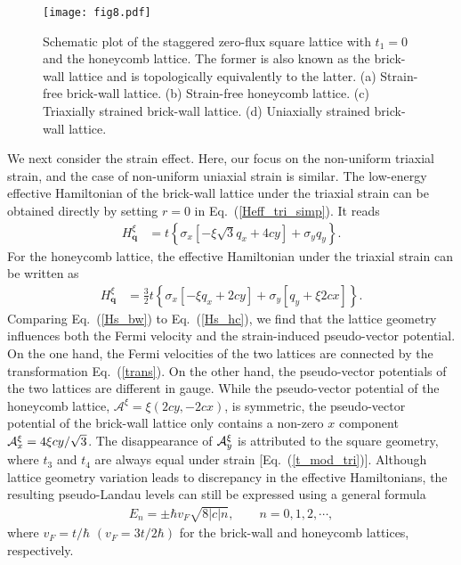 \documentclass[aps, twocolumn, floatfix, superscriptaddress, prb]{revtex4-1}
\begin{document}
%
\begin{figure}[t]
\centering
\texttt{[image: fig8.pdf]}
\caption{Schematic plot of the staggered zero-flux square lattice with $t_1=0$ and the honeycomb lattice. The former is also known as the brick-wall lattice and is topologically equivalently to the latter. (a) Strain-free brick-wall lattice. (b) Strain-free honeycomb lattice. (c) Triaxially strained brick-wall lattice. (d) Uniaxially strained brick-wall lattice.
}\label{fig8}
\end{figure}
%



We next consider the strain effect. Here, our focus on the non-uniform triaxial strain, and the case of non-uniform uniaxial strain is similar. The low-energy effective Hamiltonian of the brick-wall lattice under the triaxial strain can be obtained directly by setting $r=0$ in Eq.~(\ref{Heff_tri_simp}). It reads
%
\begin{align}\label{Hs_bw}
  H_{\bm q}^\xi&=t\left\{\sigma_x\left[-\xi {\sqrt3}q_x+4cy\right]+\sigma_yq_y\right\}.
\end{align}
%
For the honeycomb lattice, the effective Hamiltonian under the triaxial strain can be written as~\cite{sun2022}
%
\begin{align} \label{Hs_hc}
  H_{\bm q}^\xi&=\frac{3}2t\left\{\sigma_x[-\xi q_x+2cy]+\sigma_y[q_y+\xi2cx]\right\}.
\end{align}
%
Comparing Eq.~(\ref{Hs_bw}) to Eq.~(\ref{Hs_hc}), we find that the lattice geometry influences both the Fermi velocity and the strain-induced pseudo-vector potential. On the one hand, the Fermi velocities of the two lattices are connected by the transformation Eq.~(\ref{trans}). On the other hand, the pseudo-vector potentials of the two lattices are different in gauge. While the pseudo-vector potential of the honeycomb lattice, ${{\bm {\mathcal A}}^\xi=\xi(2cy,-2cx)}$, is symmetric, the pseudo-vector potential of the brick-wall lattice only contains a non-zero $x$ component ${\cal A}^{\xi}_x=4\xi cy/\sqrt{3}$. The disappearance of ${\cal A}^{\xi}_y$ is attributed to the square geometry, where $t_3$ and $t_4$ are always equal under strain [Eq.~(\ref{t_mod_tri})]. Although lattice geometry variation leads to discrepancy in the effective Hamiltonians, the resulting pseudo-Landau levels can still be expressed using a general formula
%
\begin{align}
E_n=\pm \hbar v_{F} \sqrt{8|c|n},\qquad n=0, 1, 2,\cdots,
\end{align}
%
where {$v_{F}=t/\hbar$ $(v_F=3t/2\hbar)$} for the brick-wall and honeycomb lattices, respectively.
\end{document}
